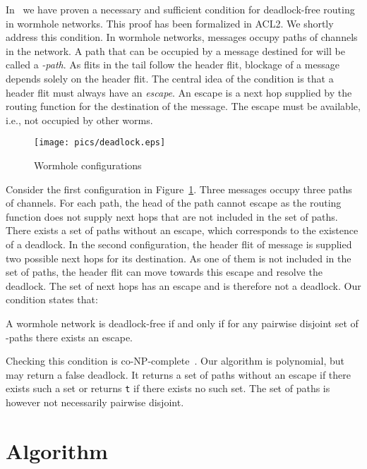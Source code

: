 \documentclass[submission,copyright]{eptcs}
\begin{document}
In~\cite{verbeekschmaltz:tpds10} we have proven a necessary and sufficient condition for deadlock-free routing in wormhole networks. This proof has been formalized in ACL2. We shortly address this condition. In wormhole networks, messages occupy paths of channels in the network. A path that can be occupied by a message destined for  will be called a \emph{-path}. As flits in the tail follow the header flit, blockage of a message depends solely on the header flit. The central idea of the condition is that a header flit must always have an \emph{escape}. An escape is a next hop supplied by the routing function for the destination of the message. The escape must be available, i.e., not occupied by other worms.

\begin{figure}[hbpt]
\centering
\texttt{[image: pics/deadlock.eps]}
\caption{Wormhole configurations}
\label{fig:deadlock}
\end{figure}

Consider the first configuration in Figure~\ref{fig:deadlock}. Three messages occupy three paths of channels. For each path, the head of the path cannot escape as the routing function does not supply next hops that are not included in the set of paths. There exists a set of paths without an escape, which corresponds to the existence of a deadlock. In the second configuration, the header flit of message  is supplied two possible next hops for its destination. As one of them is not included in the set of paths, the header flit can move towards this escape and resolve the deadlock. The set of next hops has an escape and is therefore not a deadlock.
Our condition states that:
\begin{center}
A wormhole network is deadlock-free if and only if for any pairwise disjoint set of -paths there exists an escape.
\end{center}

Checking this condition is co-NP-complete~\cite{verbeekschmaltz:tpds10}. Our algorithm is polynomial, but may return a false deadlock. It returns a set of paths without an escape if there exists such a set or returns {\tt t} if there exists no such set. The set of paths is however not necessarily pairwise disjoint.

\section{Algorithm}\label{sec:algo}
\end{document}
